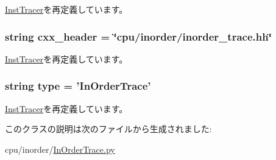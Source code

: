 \hyperlink{classInstTracer_1_1InstTracer_a58cd55cd4023648e138237cfc0822ae3}{InstTracer}を再定義しています。\hypertarget{classInOrderTrace_1_1InOrderTrace_a17da7064bc5c518791f0c891eff05fda}{
\subsubsection[{cxx\_\-header}]{\setlength{\rightskip}{0pt plus 5cm}string {\bf cxx\_\-header} = \char`\"{}cpu/inorder/inorder\_\-trace.hh\char`\"{}}}
\label{classInOrderTrace_1_1InOrderTrace_a17da7064bc5c518791f0c891eff05fda}


\hyperlink{classInstTracer_1_1InstTracer_a17da7064bc5c518791f0c891eff05fda}{InstTracer}を再定義しています。\hypertarget{classInOrderTrace_1_1InOrderTrace_acce15679d830831b0bbe8ebc2a60b2ca}{
\subsubsection[{type}]{\setlength{\rightskip}{0pt plus 5cm}string {\bf type} = '{\bf InOrderTrace}'}}
\label{classInOrderTrace_1_1InOrderTrace_acce15679d830831b0bbe8ebc2a60b2ca}


\hyperlink{classInstTracer_1_1InstTracer_acce15679d830831b0bbe8ebc2a60b2ca}{InstTracer}を再定義しています。

このクラスの説明は次のファイルから生成されました:\begin{DoxyCompactItemize}
\item 
cpu/inorder/\hyperlink{InOrderTrace_8py}{InOrderTrace.py}\end{DoxyCompactItemize}
